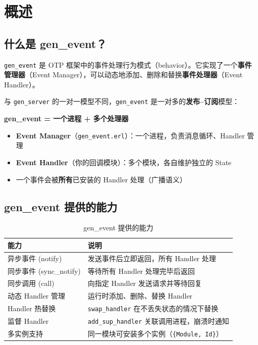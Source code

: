 \documentclass[a4paper,11pt]{article}
\begin{document}
\newpage
\tableofcontents
\newpage


\section{概述}

\subsection{什么是 gen\_event？}

\texttt{gen\_event} 是 OTP 框架中的事件处理行为模式（behavior）。它实现了一个\textbf{事件管理器}（Event Manager），可以动态地添加、删除和替换\textbf{事件处理器}（Event Handler）。

与 \texttt{gen\_server} 的一对一模型不同，\texttt{gen\_event} 是一对多的\textbf{发布--订阅}模型：

\begin{tipbox}[核心思想]
\textbf{gen\_event = 一个进程 + 多个处理器}

\begin{itemize}[leftmargin=1.5em]
    \item \textbf{Event Manager}（\texttt{gen\_event.erl}）：一个进程，负责消息循环、Handler 管理
    \item \textbf{Event Handler}（你的回调模块）：多个模块，各自维护独立的 State
    \item 一个事件会被\textbf{所有}已安装的 Handler 处理（广播语义）
\end{itemize}
\end{tipbox}

\subsection{gen\_event 提供的能力}

\begin{table}[H]
\centering
\begin{tabular}{@{}ll@{}}
\toprule
\textbf{能力} & \textbf{说明} \\
\midrule
异步事件 (notify)      & 发送事件后立即返回，所有 Handler 处理 \\
同步事件 (sync\_notify) & 等待所有 Handler 处理完毕后返回 \\
同步调用 (call)         & 向指定 Handler 发送请求并等待回复 \\
动态 Handler 管理       & 运行时添加、删除、替换 Handler \\
Handler 热替换          & \texttt{swap\_handler} 在不丢失状态的情况下替换 \\
监督 Handler            & \texttt{add\_sup\_handler} 关联调用进程，崩溃时通知 \\
多实例支持              & 同一模块可安装多个实例（\texttt{\{Module, Id\}}） \\
\bottomrule
\end{tabular}
\caption{gen\_event 提供的能力}
\end{table}
\end{document}
